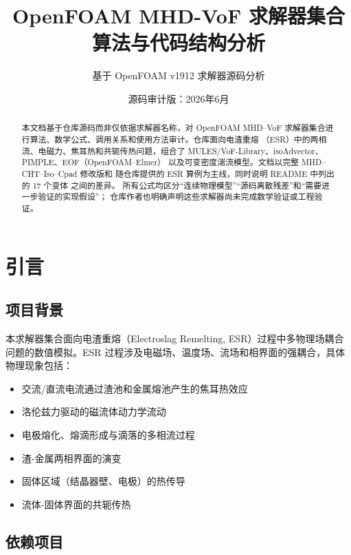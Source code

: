 \documentclass[11pt,a4paper]{article}
\title{\textbf{OpenFOAM MHD-VoF 求解器集合\\算法与代码结构分析}}
\author{基于 OpenFOAM v1912 求解器源码分析}
\date{源码审计版：2026年6月}
\begin{document}
\maketitle

\begin{abstract}
本文档基于仓库源码而非仅依据求解器名称，对 OpenFOAM MHD--VoF
求解器集合进行算法、数学公式、调用关系和使用方法审计。仓库面向电渣重熔
（ESR）中的两相流、电磁力、焦耳热和共轭传热问题，组合了
MULES/VoF-Library、isoAdvector、PIMPLE、EOF（OpenFOAM--Elmer）
以及可变密度湍流模型。文档以完整 MHD--CHT--Iso--Cpad 修改版和
随仓库提供的 ESR 算例为主线，同时说明 README 中列出的 17 个变体
之间的差异。
所有公式均区分“连续物理模型”“源码离散残差”和“需要进一步验证的实现假设”；
仓库作者也明确声明这些求解器尚未完成数学验证或工程验证。
\end{abstract}

\tableofcontents
\newpage

\section{引言}

\subsection{项目背景}

本求解器集合面向电渣重熔（Electroslag Remelting, ESR）过程中多物理场耦合问题的数值模拟。ESR 过程涉及电磁场、温度场、流场和相界面的强耦合，具体物理现象包括：

\begin{itemize}
    \item 交流/直流电流通过渣池和金属熔池产生的焦耳热效应
    \item 洛伦兹力驱动的磁流体动力学流动
    \item 电极熔化、熔滴形成与滴落的多相流过程
    \item 渣-金属两相界面的演变
    \item 固体区域（结晶器壁、电极）的热传导
    \item 流体-固体界面的共轭传热
\end{itemize}

\subsection{依赖项目}
\end{document}
